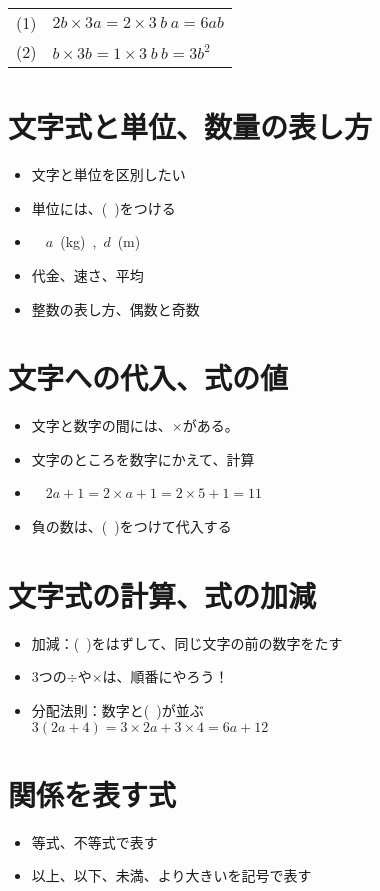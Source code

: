 \documentclass[11pt]{article}
\begin{document}

\begin{tabular}{ll}
(1) & $2b \times 3a = 2 \times 3 \ b \ a = 6 ab$\\
(2) & $b \times 3b = 1 \times 3\ b \  b = 3b^2$\\
\end{tabular}


\section{文字式と単位、数量の表し方}
\begin{itemize}
\item 文字と単位を区別したい
\item 単位には、(\ )をつける
\item {} \ \ $a$\ (kg)\ ,\ $d$\ (m)
\item 代金、速さ、平均
\item 整数の表し方、偶数と奇数
\end{itemize}


\section{文字への代入、式の値}
\begin{itemize}
\item 文字と数字の間には、$\times$がある。
\item 文字のところを数字にかえて、計算
\item {} \ \ $2a+1 = 2 \times a +1 = 2 \times 5 +1 =11$
\item 負の数は、(\ )をつけて代入する
\end{itemize}

\section{文字式の計算、式の加減}
\begin{itemize}
\item 加減：(\ )をはずして、同じ文字の前の数字をたす
\item 3つの$\div$や$\times$は、順番にやろう！
\item 分配法則：数字と(\ )が並ぶ\\ 
$3(2a+4)=3 \times 2a + 3 \times 4 =6a+12$
\end{itemize}

\section{関係を表す式}
\begin{itemize}
\item 等式、不等式で表す
\item 以上、以下、未満、より大きいを記号で表す
\end{itemize}
\end{document}
